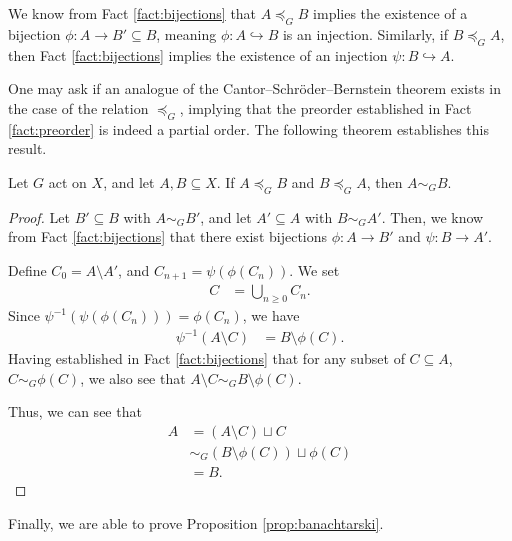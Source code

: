 We know from Fact \ref{fact:bijections} that $A\preceq_{G}B$ implies the existence of a bijection $\phi\colon A\rightarrow B'\subseteq B$, meaning $\phi\colon A\hookrightarrow B$ is an injection. Similarly, if $B\preceq_{G}A$, then Fact \ref{fact:bijections} implies the existence of an injection $\psi\colon B\hookrightarrow A$.\newline

One may ask if an analogue of the Cantor--Schröder--Bernstein theorem exists in the case of the relation $\preceq_{G}$, implying that the preorder established in Fact \ref{fact:preorder} is indeed a partial order. The following theorem establishes this result.
\begin{theorem}
  Let $G$ act on $X$, and let $A,B\subseteq X$. If $A\preceq_{G}B$ and $B\preceq_{G}A$, then $A\sim_{G}B$.\label{thm:csb_for_equidecomposability}
\end{theorem}
\begin{proof}
  Let $B'\subseteq B$ with $A\sim_{G}B'$, and let $A'\subseteq A$ with $B\sim_{G}A'$. Then, we know from Fact \ref{fact:bijections} that there exist bijections $\phi\colon A\rightarrow B'$ and $\psi\colon B\rightarrow A'$.\newline

  Define $C_0 = A\setminus A'$, and $C_{n+1} = \psi\left(\phi\left(C_n\right)\right)$. We set
  \begin{align*}
    C &= \bigcup_{n\geq 0}C_{n}.
  \end{align*}
  Since $\psi^{-1}\left(\psi\left(\phi\left(C_n\right)\right)\right) = \phi\left(C_n\right)$, we have
  \begin{align*}
    \psi^{-1}\left(A\setminus C\right) &= B\setminus \phi(C).
  \end{align*}
  Having established in Fact \ref{fact:bijections} that for any subset of $C\subseteq A$, $C\sim_{G} \phi(C)$, we also see that $A\setminus C \sim_{G} B\setminus \phi(C)$.\newline

  Thus, we can see that
  \begin{align*}
    A &= \left(A\setminus C\right)\sqcup C\\
      &\sim_{G}\left(B\setminus \phi(C)\right)\sqcup \phi(C)\\
      &= B.
  \end{align*}
\end{proof}

Finally, we are able to prove Proposition \ref{prop:banachtarski}.\newline


